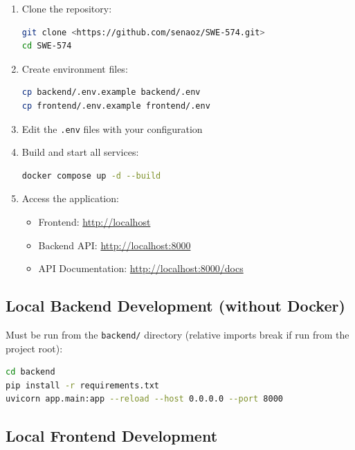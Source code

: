 \documentclass[11pt,a4paper]{report}
\begin{document}
\begin{enumerate}
    \item Clone the repository:
          \begin{lstlisting}[language=bash]
git clone <https://github.com/senaoz/SWE-574.git>
cd SWE-574
    \end{lstlisting}

    \item Create environment files:
          \begin{lstlisting}[language=bash]
cp backend/.env.example backend/.env
cp frontend/.env.example frontend/.env
    \end{lstlisting}

    \item Edit the \texttt{.env} files with your configuration

    \item Build and start all services:
          \begin{lstlisting}[language=bash]
docker compose up -d --build
    \end{lstlisting}

    \item Access the application:
          \begin{itemize}
              \item Frontend: \url{http://localhost}
              \item Backend API: \url{http://localhost:8000}
              \item API Documentation: \url{http://localhost:8000/docs}
          \end{itemize}
\end{enumerate}

\subsection{Local Backend Development (without Docker)}

Must be run from the \texttt{backend/} directory (relative imports break if run from the project root):

\begin{lstlisting}[language=bash]
cd backend
pip install -r requirements.txt
uvicorn app.main:app --reload --host 0.0.0.0 --port 8000
\end{lstlisting}

\subsection{Local Frontend Development}
\end{document}
